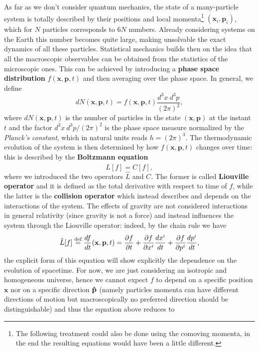 As far as we don't consider quantum mechanics, the state of a many-particle system is totally described by their positions and local momenta\footnote{The following treatment could also be done using the comoving momenta, in the end the resulting equations would have been a little different.} $(\mathbf x_i,\mathbf p_i)$, which for $N$ particles corresponds to $6N$ numbers. Already considering systems on the Earth this number becomes quite large, making unsolvable the exact dynamics of all these particles. Statistical mechanics builds then on the idea that all the macroscopic observables can be obtained from the statistics of the microscopic ones. This can be achieved by introducing a \textbf{phase space distribution} $f(\mathbf x,\mathbf p, t)$ and then averaging over the phase space. In general, we define
\begin{equation}
    \label{eq:phspace_dist}
    dN(\mathbf x,\mathbf p, t)=f(\mathbf x,\mathbf p, t) \frac{d^3x\ d^3p}{(2\pi)^2},
\end{equation}
where $dN(\mathbf x,\mathbf p, t)$ is the number of particles in the state $(\mathbf x,\mathbf p)$ at the instant $t$ and the factor $d^3x\ d^3p/(2\pi)^2$ is the phase space measure normalized by the \emph{Planck's constant}, which in natural units reads $h=(2\pi)^{3}$. The thermodynamic evolution of the system is then determined by how $f(\mathbf x,\mathbf p, t)$ changes over time: this is described by the \textbf{Boltzmann equation}
\begin{equation}
    \label{eq:Boltzmann}
    \hat{L}[f]=C[f],
\end{equation}
where we introduced the two operators $\hat{L}$ and $C$. The former is called \textbf{Liouville operator} and it is defined as the total derivative with respect to time of $f$, while the latter is the \textbf{collision operator} which instead describes and depends on the interactions of the system. The effects of gravity are not considered interactions in general relativity (since gravity is not a force) and instead influences the system through the Liouville operator: indeed, by the chain rule we have 
$$ 
\hat{L}[f]\stackrel{\text{def}}{=}\frac{df}{dt}(\mathbf x,\mathbf p, t)= \frac{\partial f}{\partial t}+\frac{\partial f}{\partial x^i}\frac{dx^i}{dt}+\frac{\partial f}{\partial p^i}\frac{dp^i}{dt},
$$ 
the explicit form of this equation will show explicitly the dependence on the evolution of spacetime. For now, we are just considering an isotropic and homogeneous universe, hence we cannot expect $f$ to depend on a specific position $\mathbf{x}$ nor on a specific direction $\mathbf{\hat{p}}$ (namely particles momenta can have different directions of motion but macroscopically no preferred direction should be distinguishable) and thus the equation above reduces to 
